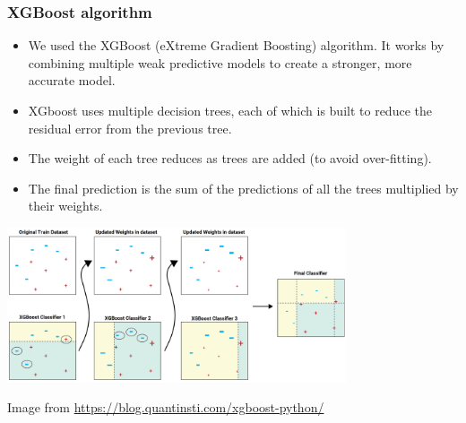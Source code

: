 \begin{frame}
\frametitle{XGBoost algorithm}

\begin{itemize}
    \small
    \item We used the XGBoost  (eXtreme Gradient Boosting) algorithm. It works by combining multiple weak predictive models to  create a stronger, more accurate model.
    \item XGboost uses multiple decision trees, each of which is built to reduce the residual error from the previous tree.
    \item The weight of each tree reduces as trees are added (to avoid over-fitting).
    \item The final prediction is the sum of the predictions of all the trees multiplied by their weights.

\end{itemize}

\begin{center}
\includegraphics[width=0.75\textwidth]{./images/xgboost}
\end{center}

\tiny
Image from \url{https://blog.quantinsti.com/xgboost-python/}

\end{frame}